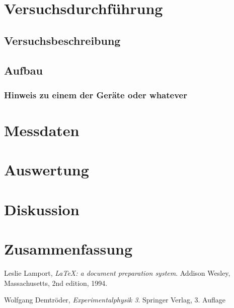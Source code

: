 \documentclass[10pt, a4paper]{article}
\begin{document}
\section{Versuchsdurchführung}

\subsection{Versuchsbeschreibung}

\subsection{Aufbau}

\subsubsection{Hinweis zu einem der Geräte oder whatever}

\section{Messdaten}

\section{Auswertung}

\section{Diskussion}

\section{Zusammenfassung}


\begin{thebibliography}{9}

  Leslie Lamport,
  \emph{\LaTeX: a document preparation system}.
  Addison Wesley, Massachusetts,
  2nd edition,
  1994.
  
	Wolfgang Demtröder,
	\emph{Experimentalphysik 3}.
	Springer Verlag,
	3. Auflage
\end{thebibliography}


\newpage

\begin{appendix}

\end{appendix}
\end{document}
